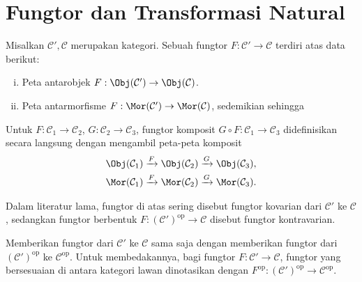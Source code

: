 \section{Fungtor dan Transformasi Natural}\label{sec:functors}
\begin{definition}[Fungtor]\label{def:functor}
	Misalkan $\mathcal{C}', \mathcal{C}$ merupakan kategori. Sebuah fungtor $F: \mathcal{C}' \to \mathcal{C}$ terdiri atas data berikut:
	\begin{enumerate}[(i)]
		\item Peta antarobjek $F: \Obj(\mathcal{C}') \to \Obj(\mathcal{C})$.
		\item Peta antarmorfisme $F: \Mor(\mathcal{C}') \to \Mor(\mathcal{C})$, sedemikian sehingga
	\end{enumerate}
	Untuk $F: \mathcal{C}_1 \to \mathcal{C}_2$, $G: \mathcal{C}_2 \to \mathcal{C}_3$, fungtor komposit $G \circ F: \mathcal{C}_1 \to \mathcal{C}_3$ didefinisikan secara langsung dengan mengambil peta-peta komposit
	\begin{gather*}
		\Obj(\mathcal{C}_1) \xrightarrow{F} \Obj(\mathcal{C}_2) \xrightarrow{G} \Obj(\mathcal{C}_3), \\
		\Mor(\mathcal{C}_1) \xrightarrow{F} \Mor(\mathcal{C}_2) \xrightarrow{G} \Mor(\mathcal{C}_3).
	\end{gather*}
\end{definition}
Dalam literatur lama, fungtor di atas sering disebut fungtor kovarian dari $\mathcal{C}'$ ke $\mathcal{C}$, sedangkan fungtor berbentuk $F: (\mathcal{C}')^\text{op} \to \mathcal{C}$ disebut fungtor kontravarian.

\begin{remark}\label{rem:op-functor}
	Memberikan fungtor dari $\mathcal{C}'$ ke $\mathcal{C}$ sama saja dengan memberikan fungtor dari $(\mathcal{C}')^\text{op}$ ke $\mathcal{C}^\text{op}$. Untuk membedakannya, bagi fungtor $F: \mathcal{C}' \to \mathcal{C}$, fungtor yang bersesuaian di antara kategori lawan dinotasikan dengan $F^\text{op}: (\mathcal{C}')^\text{op} \to \mathcal{C}^\text{op}$.
\end{remark}

